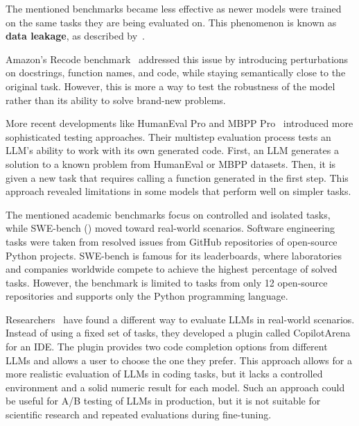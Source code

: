 The mentioned benchmarks became less effective as newer models were trained on the same tasks they are being evaluated on.
This phenomenon is known as \textbf{data leakage}, as described by~\cite{vendrow2025largelanguagemodelbenchmarks}.

Amazon's Recode benchmark~\cite{recode_wang2022} addressed this issue by introducing perturbations on docstrings, function names, and code, while staying semantically close to the original task.
However, this is more a way to test the robustness of the model rather than its ability to solve brand-new problems.

More recent developments like HumanEval Pro and MBPP Pro~\cite{yu2024humanevalprombpppro} introduced more sophisticated testing approaches.
Their multistep evaluation process tests an LLM's ability to work with its own generated code.
First, an LLM generates a solution to a known problem from HumanEval or MBPP datasets.
Then, it is given a new task that requires calling a function generated in the first step.
This approach revealed limitations in some models that perform well on simpler tasks.

The mentioned academic benchmarks focus on controlled and isolated tasks, while SWE-bench (\cite{jimenez2024swebenchlanguagemodelsresolve}) moved toward real-world scenarios.
Software engineering tasks were taken from resolved issues from GitHub repositories of open-source Python projects.
SWE-bench is famous for its leaderboards, where laboratories and companies worldwide compete to achieve the highest percentage of solved tasks.
However, the benchmark is limited to tasks from only 12 open-source repositories and supports only the Python programming language.

Researchers~\cite{chi2025copilotarenaplatformcode} have found a different way to evaluate LLMs in real-world scenarios.
Instead of using a fixed set of tasks, they developed a plugin called CopilotArena for an IDE.
The plugin provides two code completion options from different LLMs and allows a user to choose the one they prefer.
This approach allows for a more realistic evaluation of LLMs in coding tasks, but it lacks a controlled environment and a solid numeric result for each model.
Such an approach could be useful for A/B testing of LLMs in production, but it is not suitable for scientific research and repeated evaluations during fine-tuning.

